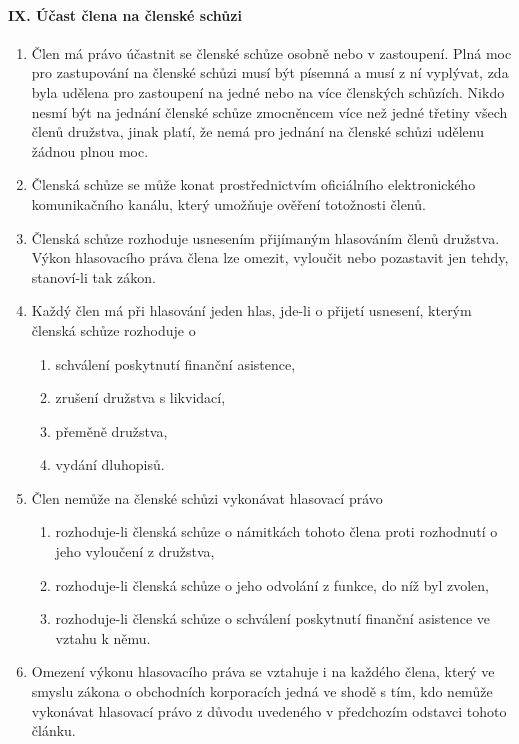 \paragraph{IX. Účast člena na členské schůzi}
\begin{enumerate}
    \item Člen má právo účastnit se členské schůze osobně nebo v zastoupení. Plná moc pro zastupování na členské schůzi musí být písemná a musí z ní vyplývat, zda byla udělena pro zastoupení na jedné nebo na více členských schůzích. Nikdo nesmí být na jednání členské schůze zmocněncem více než jedné třetiny všech členů družstva, jinak platí, že nemá pro jednání na členské schůzi udělenu žádnou plnou moc.
    \item Členská schůze se může konat prostřednictvím oficiálního elektronického komunikačního kanálu, který umožňuje ověření totožnosti členů.
    \item Členská schůze rozhoduje usnesením přijímaným hlasováním členů družstva. Výkon hlasovacího práva člena lze omezit, vyloučit nebo pozastavit jen tehdy, stanoví-li tak zákon.
    \item Každý člen má při hlasování jeden hlas, jde-li o přijetí usnesení, kterým členská schůze rozhoduje o
    \begin{enumerate}[label=\alph*.]
        \item schválení poskytnutí finanční asistence,
        \item zrušení družstva s likvidací,
        \item přeměně družstva,
        \item vydání dluhopisů.
    \end{enumerate}
    \item Člen nemůže na členské schůzi vykonávat hlasovací právo
    \begin{enumerate}[label=\alph*.]
        \item rozhoduje-li členská schůze o námitkách tohoto člena proti rozhodnutí o jeho vyloučení z družstva,
        \item rozhoduje-li členská schůze o jeho odvolání z funkce, do níž byl zvolen,
        \item rozhoduje-li členská schůze o schválení poskytnutí finanční asistence ve vztahu k němu.
    \end{enumerate}
    \item Omezení výkonu hlasovacího práva se vztahuje i na každého člena, který ve smyslu zákona o obchodních korporacích jedná ve shodě s tím, kdo nemůže vykonávat hlasovací právo z důvodu uvedeného v předchozím odstavci tohoto článku.
\end{enumerate}

